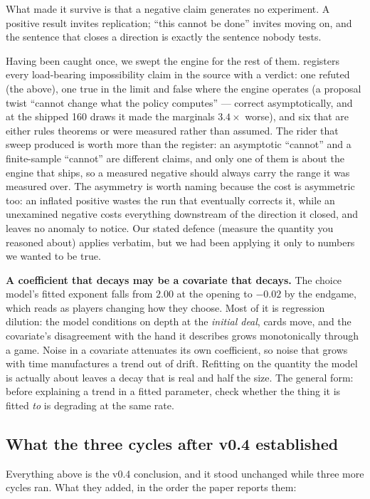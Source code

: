 \documentclass[11pt,letterpaper]{article}
\begin{document}
What made it survive is that a negative claim generates no experiment. A positive
result invites replication; ``this cannot be done'' invites moving on, and the
sentence that closes a direction is exactly the sentence nobody tests.

Having been caught once, we swept the engine for the rest of them.
 registers every load-bearing impossibility
claim in the source with a verdict: one refuted (the above), one true in the
limit and false where the engine operates (a proposal twist ``cannot change what
the policy computes'' --- correct asymptotically, and at the shipped 160 draws it
made the marginals $3.4\times$ worse), and six that are either rules theorems or
were measured rather than assumed. The rider that sweep produced is worth more
than the register: an asymptotic ``cannot'' and a finite-sample ``cannot'' are
different claims, and only one of them is about the engine that ships, so a
measured negative should always carry the range it was measured over. The
asymmetry is worth naming because the cost is asymmetric too: an inflated
positive wastes the run that eventually corrects it, while an unexamined negative
costs everything downstream of the direction it closed, and leaves no anomaly to
notice. Our stated defence (measure the quantity you reasoned about) applies
verbatim, but we had been applying it only to numbers we wanted to be true.

\textbf{A coefficient that decays may be a covariate that decays.} The choice
model's fitted exponent falls from $2.00$ at the opening to $-0.02$ by the
endgame, which reads as players changing how they choose. Most of it is
regression dilution: the model conditions on depth at the \emph{initial deal},
cards move, and the covariate's disagreement with the hand it describes grows
monotonically through a game. Noise in a covariate attenuates its own
coefficient, so noise that grows with time manufactures a trend out of drift.
Refitting on the quantity the model is actually about leaves a decay that is real
and half the size. The general form: before explaining a trend in a fitted
parameter, check whether the thing it is fitted \emph{to} is degrading at the
same rate.

\subsection{What the three cycles after v0.4 established}

Everything above is the v0.4 conclusion, and it stood unchanged while three
more cycles ran. What they added, in the order the paper reports them:
\end{document}
